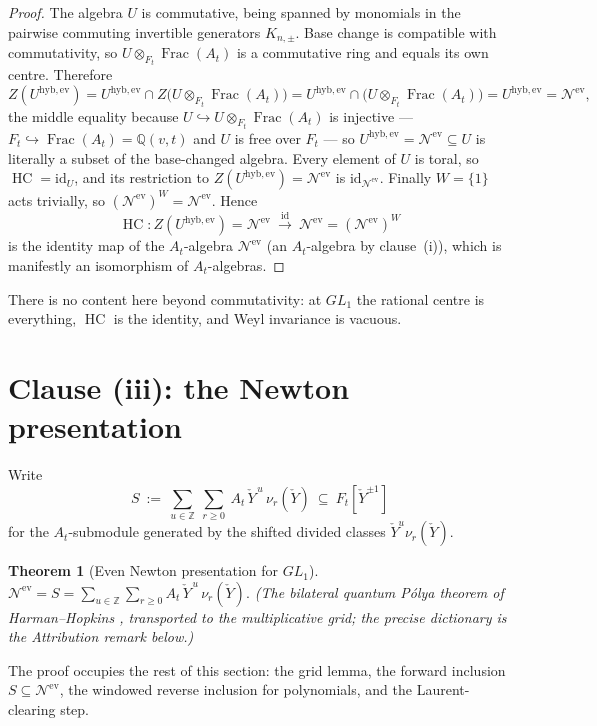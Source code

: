 \documentclass[11pt]{article}
\newtheorem{theorem}{Theorem}
\newcommand{\At}{A_t}
\newcommand{\Ft}{F_t}
\newcommand{\Nev}{\mathcal N^{\mathrm{ev}}}
\newcommand{\Uev}{U^{\mathrm{hyb,ev}}}
\newcommand{\HC}{\operatorname{HC}}
\newcommand{\Yc}{\check Y}
\newcommand{\Z}{\mathbb Z}
\begin{document}
\begin{proof}
The algebra $U$ is commutative, being spanned by monomials in the pairwise
commuting invertible generators $K_{n,\pm}$. Base change is compatible with
commutativity, so $U\otimes_{\Ft}\operatorname{Frac}(\At)$ is a commutative ring
and equals its own centre. Therefore
\[
  Z(\Uev)=\Uev\cap Z\bigl(U\otimes_{\Ft}\operatorname{Frac}(\At)\bigr)
        =\Uev\cap\bigl(U\otimes_{\Ft}\operatorname{Frac}(\At)\bigr)
        =\Uev=\Nev,
\]
the middle equality because $U\hookrightarrow U\otimes_{\Ft}\operatorname{Frac}(\At)$
is injective --- $\Ft\hookrightarrow\operatorname{Frac}(\At)=\mathbb Q(v,t)$ and $U$ is
free over $\Ft$ --- so $\Uev=\Nev\subseteq U$ is literally a subset of the base-changed
algebra.
Every element of $U$ is toral, so $\HC=\mathrm{id}_U$, and its restriction to
$Z(\Uev)=\Nev$ is $\mathrm{id}_{\Nev}$. Finally $W=\{1\}$ acts trivially, so
$(\Nev)^{W}=\Nev$. Hence
\[
  \HC\colon Z(\Uev)=\Nev\ \xrightarrow{\ \mathrm{id}\ }\ \Nev=(\Nev)^{W}
\]
is the identity map of the $\At$-algebra $\Nev$ (an $\At$-algebra by clause~(i)),
which is manifestly an isomorphism of $\At$-algebras.
\end{proof}

\noindent
There is no content here beyond commutativity: at $GL_1$ the rational centre is
everything, $\HC$ is the identity, and Weyl invariance is vacuous.

\section{Clause (iii): the Newton presentation}

Write
\[
  S\ :=\ \sum_{u\in\Z}\ \sum_{r\ge0}\ \At\,\Yc^{\,u}\,\nu_{r}(\Yc)\ \subseteq\
  \Ft[\Yc^{\pm1}]
\]
for the $\At$-submodule generated by the shifted divided classes
$\Yc^{u}\nu_r(\Yc)$.

\begin{theorem}[Even Newton presentation for $GL_1$]\label{thm:iii}
$\displaystyle \Nev=S=\sum_{u\in\Z}\sum_{r\ge0}\At\,\Yc^{\,u}\,\nu_r(\Yc).$
(The bilateral quantum P\'olya theorem of Harman--Hopkins
\cite[\S\S1,4]{HarmanHopkins}, transported to the multiplicative grid; the
precise dictionary is the Attribution remark below.)
\end{theorem}

The proof occupies the rest of this section: the grid lemma, the forward
inclusion $S\subseteq\Nev$, the windowed reverse inclusion for polynomials, and
the Laurent-clearing step.
\end{document}
